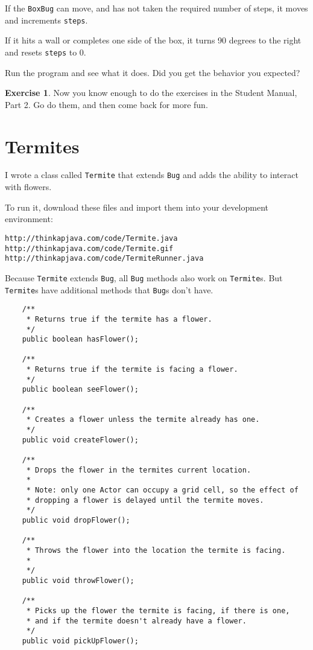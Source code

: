 \documentclass[12pt]{book}
\theoremstyle{definition}
\newtheorem{excz}{Exercise}[chapter]
\newenvironment{exercise}{\bigskip\begin{excz}\mbox{}}{\end{excz}}
\begin{document}
If the {\tt BoxBug} can move, and has not taken the required number
of steps, it moves and increments {\tt steps}.

If it hits a wall or completes one side of the box, it turns 90 degrees
to the right and resets {\tt steps} to 0.

Run the program and see what it does.  Did you get the behavior you
expected?

\begin{exercise}
Now you know enough to do the exercises in the Student Manual, Part 2.
Go do them, and then come back for more fun.
\end{exercise}


\section{Termites}

I wrote a class called {\tt Termite} that extends {\tt Bug} and adds
the ability to interact with flowers.

To run it, download these files and import them into your development
environment:

\begin{lstlisting}
http://thinkapjava.com/code/Termite.java
http://thinkapjava.com/code/Termite.gif
http://thinkapjava.com/code/TermiteRunner.java
\end{lstlisting}

Because {\tt Termite} extends {\tt Bug}, all {\tt Bug} methods
also work on {\tt Termite}s.  But {\tt Termite}s have additional
methods that {\tt Bug}s don't have.

\begin{lstlisting}
    /**
     * Returns true if the termite has a flower.
     */
    public boolean hasFlower();

    /**
     * Returns true if the termite is facing a flower.
     */
    public boolean seeFlower();

    /**
     * Creates a flower unless the termite already has one.
     */
    public void createFlower();

    /**
     * Drops the flower in the termites current location.
     * 
     * Note: only one Actor can occupy a grid cell, so the effect of
     * dropping a flower is delayed until the termite moves.
     */
    public void dropFlower();

    /**
     * Throws the flower into the location the termite is facing.
     * 
     */
    public void throwFlower();

    /**
     * Picks up the flower the termite is facing, if there is one,
     * and if the termite doesn't already have a flower.
     */
    public void pickUpFlower();
\end{lstlisting}
\end{document}
